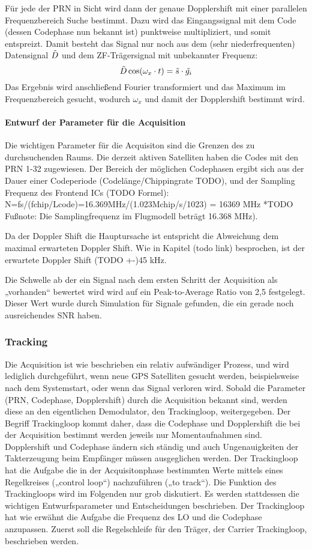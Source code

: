 Für jede der PRN in Sicht wird dann der genaue Dopplershift mit einer parallelen Frequenzbereich Suche bestimmt. Dazu wird das Eingangssignal mit dem Code (dessen Codephase nun bekannt ist) punktweise multipliziert, und somit entspreizt. Damit besteht das Signal nur noch aus dem (sehr niederfrequenten) Datensignal $\tilde{D}$ und dem ZF-Trägersignal mit unbekannter Frequenz:
\begin{equation}
	\tilde{D} \cos(\omega_x \cdot t) = \tilde{s} \cdot \tilde{g_i}
\end{equation}
Das Ergebnis wird anschließend Fourier transformiert und das Maximum im Frequenzbereich gesucht, wodurch $\omega_x$ und damit der Dopplershift bestimmt wird.

\paragraph{Entwurf der Parameter für die Acquisition}
Die wichtigen Parameter für die Acquisiton sind die Grenzen des zu durchsuchenden Raums.
Die derzeit aktiven Satelliten haben die Codes mit den PRN 1-32 zugewiesen. Der Bereich der möglichen Codephasen ergibt sich aus der Dauer einer Codeperiode (Codelänge/Chippingrate TODO), und der Sampling Frequenz des Frontend ICs (TODO Formel): N=fs/(fchip/Lcode)=16.369MHz/(1.023Mchip/s/1023) = 16369 MHz *TODO Fußnote: Die Samplingfrequenz im Flugmodell beträgt 16.368 MHz).

Da der Doppler Shift die Hauptursache ist entspricht die Abweichung dem maximal erwarteten Doppler Shift. Wie in Kapitel (todo link) besprochen, ist der erwartete Doppler Shift (TODO +-)45 kHz.

Die Schwelle ab der ein Signal nach dem ersten Schritt der Acquisition als „vorhanden“ bewertet wird wird auf ein Peak-to-Average Ratio von 2,5 festgelegt. Dieser Wert wurde durch Simulation für Signale gefunden, die ein gerade noch ausreichendes SNR haben.

\subsubsection{Tracking}
Die Acquisition ist wie beschrieben ein relativ aufwändiger Prozess, und wird lediglich durchgeführt, wenn neue GPS Satelliten gesucht werden, beispielsweise nach dem Systemstart, oder wenn das Signal verloren wird. Sobald die Parameter (PRN, Codephase, Dopplershift) durch die Acquisition bekannt sind, werden diese an den eigentlichen Demodulator, den Trackingloop, weitergegeben. Der Begriff Trackingloop kommt daher, dass die Codephase und Dopplershift die bei der Acquisition bestimmt werden jeweils nur Momentaufnahmen sind. Dopplershift und Codephase ändern sich ständig und auch Ungenauigkeiten der Takterzeugung beim Empfänger müssen ausgeglichen werden. Der Trackingloop hat die Aufgabe die in der Acquisitonphase bestimmten Werte mittels eines Regelkreises („control loop“) nachzuführen („to track“). 
Die Funktion des Trackingloops wird im Folgenden nur grob diskutiert. Es werden stattdessen die wichtigen Entwurfsparameter und Entscheidungen beschrieben. 
Der Trackingloop hat wie erwähnt die Aufgabe die Frequenz des LO und die Codephase anzupassen. Zuerst soll die Regelschleife für den Träger, der Carrier Trackingloop, beschrieben werden.

